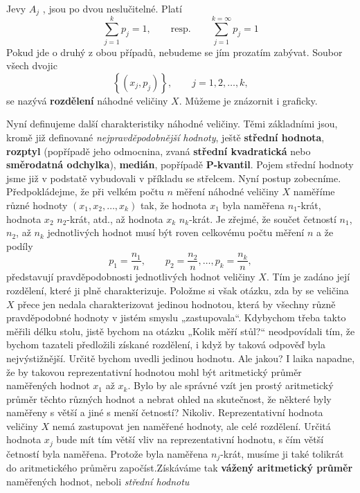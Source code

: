     Jevy \(A_j\) , jsou po dvou neslučitelné. Platí
    \begin{equation*}
      \sum_{j=1}^{k}p_j = 1, \qquad\text{resp.}\qquad \sum_{j=1}^{k=\infty}p_j = 1
    \end{equation*}
    Pokud jde o druhý z obou případů, nebudeme se jím prozatím zabývat. Soubor všech dvojic
    \begin{equation*}
      \left\lbrace(x_j, p_j)\right\rbrace,\qquad j = 1, 2, \ldots, k,
    \end{equation*}
    se nazývá \textbf{rozdělení} náhodné veličiny \(X\). Můžeme je znázornit i graficky.

    
    
    Nyní definujeme další charakteristiky náhodné veličiny. Těmi základními jsou, kromě již 
    definované \emph{nejpravděpodobnější hodnoty}, ještě \textbf{střední hodnota}, \textbf{rozptyl} 
    (popřípadě jeho odmocnina, zvaná \textbf{střední kvadratická} nebo \textbf{směrodatná 
    odchylka}), \textbf{medián}, popřípadě \textbf{P-kvantil}. Pojem střední hodnoty jsme již v 
    podstatě vybudovali v příkladu se střelcem. Nyní postup zobecníme. Předpokládejme, že při 
    velkém počtu \(n\) měření náhodné veličiny \(X\) naměříme různé hodnoty \((x_1, x_2, \ldots, 
    x_k)\) tak, že hodnota \(x_1\) byla naměřena \(n_1\)-krát, hodnota \(x_2\) \(n_2\)-krát, atd., 
    až hodnota \(x_k\) \(n_k\)-krát. Je zřejmé, že součet četností \(n_1\), \(n_2\), až \(n_k\) 
    jednotlivých hodnot musí být roven celkovému počtu měření \(n\) a že podíly
    \begin{equation*}
      p_1 = \dfrac{n_1}{n}, \qquad p_2 = \dfrac{n_2}{n}, \ldots, p_k = \dfrac{n_k}{n},
    \end{equation*}
    představují pravděpodobnosti jednotlivých hodnot veličiny \(X\). Tím je zadáno její rozdělení,
    které ji plně charakterizuje. Položme si však otázku, zda by se veličina \(X\) přece jen nedala
    charakterizovat jedinou hodnotou, která by všechny různě pravděpodobné hodnoty v jistém
    smyslu „zastupovala“. Kdybychom třeba takto měřili délku stolu, jistě bychom na otázku „Kolik
    měří stůl?“ neodpovídali tím, že bychom tazateli předložili získané rozdělení, i když by taková
    odpověď byla nejvýstižnější. Určitě bychom uvedli jedinou hodnotu. Ale jakou? I laika napadne,
    že by takovou reprezentativní hodnotou mohl být aritmetický průměr naměřených hodnot \(x_1\) až
    \(x_k\). Bylo by ale správné vzít jen prostý aritmetický průměr těchto různých hodnot a nebrat 
    ohled na skutečnost, že některé byly naměřeny s větší a jiné s menší četností? Nikoliv. 
    Reprezentativní hodnota veličiny \(X\) nemá zastupovat jen naměřené hodnoty, ale celé 
    rozdělení. Určitá hodnota \(x_j\) bude mít tím větší vliv na reprezentativní hodnotu, s čím 
    větší četností byla naměřena. Protože byla naměřena \(n_j\)-krát, musíme ji také tolikrát do 
    aritmetického průměru započíst.Získáváme tak \textbf{vážený aritmetický průměr} naměřených 
    hodnot, neboli \emph{střední hodnotu}
    
